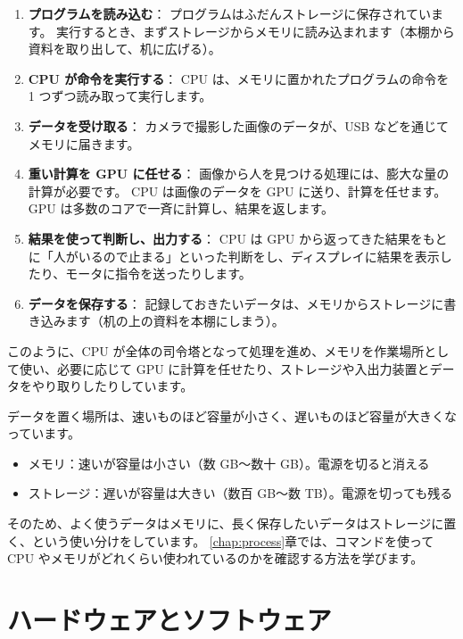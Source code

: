 \begin{enumerate}
  \item \textbf{プログラムを読み込む}：
    プログラムはふだんストレージに保存されています。
    実行するとき、まずストレージからメモリに読み込まれます（本棚から資料を取り出して、机に広げる）。
  \item \textbf{CPU が命令を実行する}：
    CPU は、メモリに置かれたプログラムの命令を 1 つずつ読み取って実行します。
  \item \textbf{データを受け取る}：
    カメラで撮影した画像のデータが、USB などを通じてメモリに届きます。
  \item \textbf{重い計算を GPU に任せる}：
    画像から人を見つける処理には、膨大な量の計算が必要です。
    CPU は画像のデータを GPU に送り、計算を任せます。
    GPU は多数のコアで一斉に計算し、結果を返します。
  \item \textbf{結果を使って判断し、出力する}：
    CPU は GPU から返ってきた結果をもとに「人がいるので止まる」といった判断をし、ディスプレイに結果を表示したり、モータに指令を送ったりします。
  \item \textbf{データを保存する}：
    記録しておきたいデータは、メモリからストレージに書き込みます（机の上の資料を本棚にしまう）。
\end{enumerate}

このように、CPU が全体の司令塔となって処理を進め、メモリを作業場所として使い、必要に応じて GPU に計算を任せたり、ストレージや入出力装置とデータをやり取りしたりしています。

\begin{point}[速さと容量の関係]
  データを置く場所は、速いものほど容量が小さく、遅いものほど容量が大きくなっています。
  \begin{itemize}
    \item メモリ：速いが容量は小さい（数 GB〜数十 GB）。電源を切ると消える
    \item ストレージ：遅いが容量は大きい（数百 GB〜数 TB）。電源を切っても残る
  \end{itemize}
  そのため、よく使うデータはメモリに、長く保存したいデータはストレージに置く、という使い分けをしています。
  \ref{chap:process}章では、コマンドを使って CPU やメモリがどれくらい使われているのかを確認する方法を学びます。
\end{point}

\section{ハードウェアとソフトウェア}
\label{sec:computer-software}

